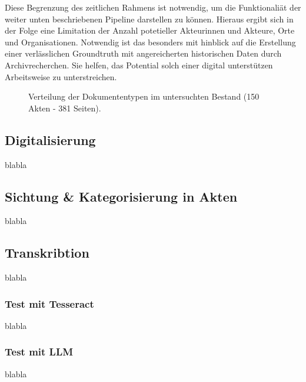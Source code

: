 \documentclass[12pt, a4paper, ngerman, bidi=default]{article}
\begin{document}
Diese Begrenzung des zeitlichen Rahmens ist notwendig, um die Funktionaliät der weiter unten beschriebenen Pipeline darstellen zu können. 
Hieraus ergibt sich in der Folge eine Limitation der Anzahl potetieller Akteurinnen und Akteure, Orte und Organisationen. Notwendig ist das 
besonders mit hinblick auf die Erstellung einer verlässlichen Groundtruth mit angereicherten
historischen Daten durch Archivrecherchen. Sie helfen, das Potential solch einer digital unterstützen Arbeitsweise zu unterstreichen. 



\begin{figure}[htbp]
  \centering
  \caption{Verteilung der Dokumententypen im untersuchten Bestand (150 Akten - 381 Seiten).}
  \label{fig:dokumententypen-bar}
\end{figure}


\subsection{Digitalisierung}
blabla
\subsection{Sichtung \& Kategorisierung in Akten}
blabla
\subsection{Transkribtion}
blabla
\subsubsection{Test mit Tesseract}
blabla
\subsubsection{Test mit LLM}
blabla
\end{document}
